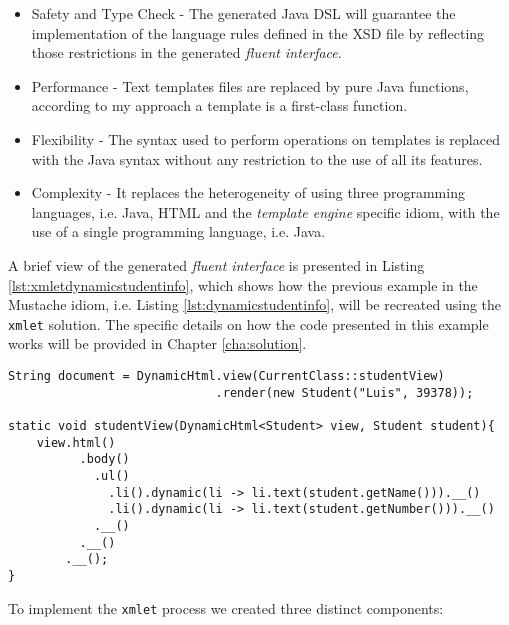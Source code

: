 \begin{itemize}
	\item Safety and Type Check - The generated Java \ac{DSL} will guarantee the implementation of the language rules defined in the \ac{XSD} file by reflecting those restrictions in the generated \textit{fluent interface}.
	\item Performance - Text templates files are replaced by pure Java functions, according to my approach a template is a first-class function.
	\item Flexibility - The syntax used to perform operations on templates is replaced with the Java syntax without any restriction to the use of all its features.
	\item Complexity - It replaces the heterogeneity of using three programming languages, i.e. Java, \ac{HTML} and the \textit{template engine} specific idiom, with the use of a single programming language, i.e. Java.
\end{itemize}

\noindent
A brief view of the generated \textit{fluent interface} is presented in Listing \ref{lst:xmletdynamicstudentinfo}, which shows how the previous example in the Mustache idiom, i.e. Listing \ref{lst:dynamicstudentinfo}, will be recreated using the \texttt{xmlet} solution. The specific details on how the code presented in this example works will be provided in Chapter \ref{cha:solution}.

\bigskip


\begin{minipage}{\linewidth}
\begin{lstlisting}[caption={Xmlet Template with Student Information}, label={lst:xmletdynamicstudentinfo}]
String document = DynamicHtml.view(CurrentClass::studentView)
                             .render(new Student("Luis", 39378));

static void studentView(DynamicHtml<Student> view, Student student){
    view.html()
          .body()
            .ul()
              .li().dynamic(li -> li.text(student.getName())).__()
              .li().dynamic(li -> li.text(student.getNumber())).__()
            .__()
          .__()
        .__();   
}
\end{lstlisting}
\end{minipage} 

\noindent
To implement the \texttt{xmlet} process we created three distinct components:

